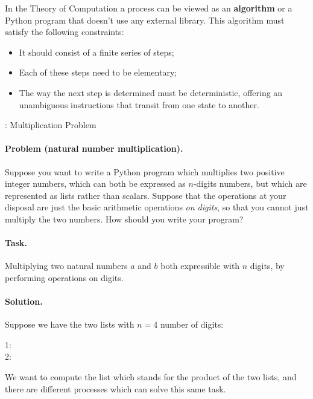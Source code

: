 \documentclass{article}
\begin{document}
			In the Theory of Computation a process can be viewed as an \textbf{algorithm} or a Python program that doesn't use any external library. This algorithm must satisfy the following constraints:
			\begin{itemize}
    			\item It should consist of a finite series of steps;
    			\item Each of these steps need to be elementary;
    			\item The way the next step is determined must be deterministic, offering an unambiguous instructions that transit from one state to another.
			\end{itemize}
			\begin{example}{: Multiplication Problem}
				{\small
				\paragraph{\small Problem (natural number multiplication).}
				Suppose you want to write a Python program which multiplies two positive integer numbers, which can both be expressed as $n$-digits numbers, but which are represented as lists rather than scalars.
				Suppose that the operations at your disposal are just the basic arithmetic operations \textit{on digits}, so that you cannot just multiply the two numbers.
				How should you write your program?\\
				\paragraph{\small Task.}
				Multiplying two natural numbers $a$ and $b$ both expressible with $n$ digits, by performing operations on digits.\\
				\paragraph{\small Solution.}
				Suppose we have the two lists with $n = 4$ number of digits:\\
				\begin{center}
					1:    \\
					2:    
				\end{center}
				We want to compute the list which stands for the product of the two lists, and there are different processes which can solve this same task.
				}
			\end{example}
\end{document}
